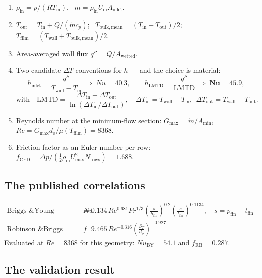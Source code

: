 \documentclass[11pt]{article}
\newcommand{\mdot}{\dot m}
\begin{document}
\begin{enumerate}[leftmargin=1.6em,itemsep=1pt]
\item $\rho_\mathrm{in} = p/(RT_\mathrm{in})$, \ $\mdot = \rho_\mathrm{in} U_\mathrm{in} A_\mathrm{inlet}$.
\item $T_\mathrm{out} = T_\mathrm{in} + Q/(\mdot c_p)$; \ $T_\mathrm{bulk,mean} = (T_\mathrm{in}+T_\mathrm{out})/2$;
\ $T_\mathrm{film} = (T_\mathrm{wall}+T_\mathrm{bulk,mean})/2$.
\item Area-averaged wall flux $q'' = Q/A_\mathrm{wetted}$.
\item Two candidate $\Delta T$ conventions for $h$ --- and the choice is material:
\[
h_\mathrm{inlet} = \frac{q''}{T_\mathrm{wall}-T_\mathrm{in}} \ \Rightarrow\ Nu = 40.3,
\qquad
h_\mathrm{LMTD} = \frac{q''}{\mathrm{LMTD}} \ \Rightarrow\ \mathbf{Nu = 45.9},
\]
\[
\text{with}\quad
\mathrm{LMTD} = \frac{\Delta T_\mathrm{in}-\Delta T_\mathrm{out}}
{\ln(\Delta T_\mathrm{in}/\Delta T_\mathrm{out})},\quad
\Delta T_\mathrm{in}=T_\mathrm{wall}-T_\mathrm{in},\ \
\Delta T_\mathrm{out}=T_\mathrm{wall}-T_\mathrm{out}.
\]
\item Reynolds number at the minimum-flow section: $G_\mathrm{max} = \mdot/A_\mathrm{min}$,
$Re = G_\mathrm{max} d_o/\mu(T_\mathrm{film}) = 8368$.
\item Friction factor as an Euler number per row:
$f_\mathrm{CFD} = \Delta p / (\tfrac12 \rho_\mathrm{in} U_\mathrm{max}^2 N_\mathrm{rows}) = 1.688$.
\end{enumerate}

\subsection{The published correlations}

\begin{align}
\text{Briggs \& Young (1963):}\quad
Nu &= 0.134\,Re^{0.681}Pr^{1/3}
      \left(\frac{s}{h_\mathrm{fin}}\right)^{0.2}
      \left(\frac{s}{t_\mathrm{fin}}\right)^{0.1134},
      \quad s = p_\mathrm{fin}-t_\mathrm{fin}\\[2pt]
\text{Robinson \& Briggs (1966):}\quad
f &= 9.465\,Re^{-0.316}\left(\frac{S_T}{d_o}\right)^{-0.927}
\end{align}
Evaluated at $Re = 8368$ for this geometry: $Nu_\mathrm{BY} = 54.1$ and $f_\mathrm{RB} = 0.287$.

\subsection{The validation result}
\end{document}
